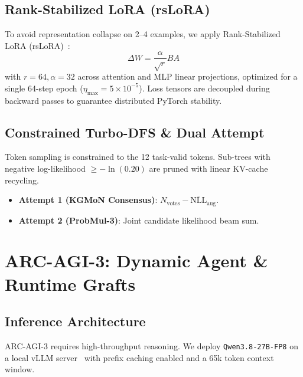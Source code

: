 \documentclass[10pt,journal,compsoc]{IEEEtran}
\begin{document}
\subsection{Rank-Stabilized LoRA (rsLoRA)}
To avoid representation collapse on 2--4 examples, we apply Rank-Stabilized LoRA (rsLoRA)~\cite{kalajdzievski2023rslora}:
\begin{equation}
    \Delta W = \frac{\alpha}{\sqrt{r}} B A
\end{equation}
with $r=64, \alpha=32$ across attention and MLP linear projections, optimized for a single 64-step epoch ($\eta_{\text{max}} = 5 \times 10^{-5}$). Loss tensors are decoupled during backward passes to guarantee distributed PyTorch stability.

\subsection{Constrained Turbo-DFS \& Dual Attempt}
Token sampling is constrained to the 12 task-valid tokens. Sub-trees with negative log-likelihood $\ge -\ln(0.20)$ are pruned with linear KV-cache recycling.
\begin{itemize}
    \item \textbf{Attempt 1 (KGMoN Consensus)}: $N_{\text{votes}} - \overline{\text{NLL}}_{\text{aug}}$.
    \item \textbf{Attempt 2 (ProbMul-3)}: Joint candidate likelihood beam sum.
\end{itemize}

\section{ARC-AGI-3: Dynamic Agent \& Runtime Grafts}
\subsection{Inference Architecture}
ARC-AGI-3 requires high-throughput reasoning. We deploy \texttt{Qwen3.8-27B-FP8} on a local vLLM server~\cite{kwon2023vllm} with prefix caching enabled and a 65k token context window.
\end{document}
